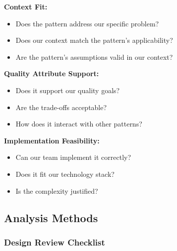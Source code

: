 \documentclass[11pt,letterpaper]{article}
\begin{document}
\begin{patternbox}
\textbf{Context Fit:}
\begin{itemize}[nosep]
    \item Does the pattern address our specific problem?
    \item Does our context match the pattern's applicability?
    \item Are the pattern's assumptions valid in our context?
\end{itemize}

\textbf{Quality Attribute Support:}
\begin{itemize}[nosep]
    \item Does it support our quality goals?
    \item Are the trade-offs acceptable?
    \item How does it interact with other patterns?
\end{itemize}

\textbf{Implementation Feasibility:}
\begin{itemize}[nosep]
    \item Can our team implement it correctly?
    \item Does it fit our technology stack?
    \item Is the complexity justified?
\end{itemize}
\end{patternbox}

\subsection{Analysis Methods}

\subsubsection{Design Review Checklist}
\end{document}

